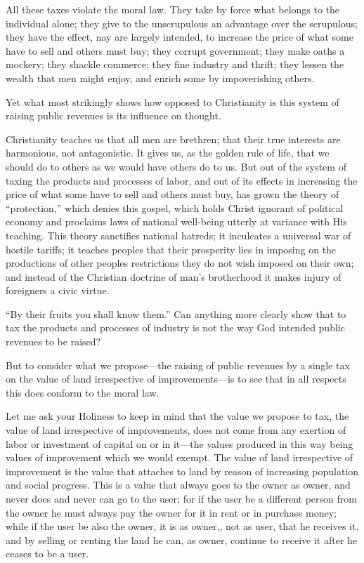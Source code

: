 \documentclass{book}
\begin{document}
All these taxes violate the moral law. They take by force what belongs to the individual alone; they give to the unscrupulous an advantage over the scrupulous; they have the effect, nay are largely intended, to increase the price of what some have to sell and others must buy; they corrupt government; they make oaths a mockery; they shackle commerce; they fine industry and thrift; they lessen the wealth that men might enjoy, and enrich some by impoverishing others.

Yet what most strikingly shows how opposed to Christianity is this system of raising public revenues is its influence on thought.

Christianity teaches us that all men are brethren; that their true interests are harmonious, not antagonistic. It gives us, as the golden rule of life, that we should do to others as we would have others do to us. But out of the system of taxing the products and processes of labor, and out of its effects in increasing the price of what some have to sell and others must buy, has grown the theory of “protection,” which denies this gospel, which holds Christ ignorant of political economy and proclaims laws of national well-being utterly at variance with His teaching. This theory sanctifies national hatreds; it inculcates a universal war of hostile tariffs; it teaches peoples that their prosperity lies in imposing on the productions of other peoples restrictions they do not wish imposed on their own; and instead of the Christian doctrine of man’s brotherhood it makes injury of foreigners a civic virtue.

“By their fruits you shall know them.” Can anything more clearly show that to tax the products and processes of industry is not the way God intended public revenues to be raised?

But to consider what we propose—the raising of public revenues by a single tax on the value of land irrespective of improvements—is to see that in all respects this does conform to the moral law.

Let me ask your Holiness to keep in mind that the value we propose to tax, the value of land irrespective of improvements, does not come from any exertion of labor or investment of capital on or in it—the values produced in this way being values of improvement which we would exempt. The value of land irrespective of improvement is the value that attaches to land by reason of increasing population and social progress. This is a value that always goes to the owner as owner, and never does and never can go to the user; for if the user be a different person from the owner he must always pay the owner for it in rent or in purchase money; while if the user be also the owner, it is as owner,, not as user, that he receives it, and by selling or renting the land he can, as owner, continue to receive it after he ceases to be a user.
\end{document}
